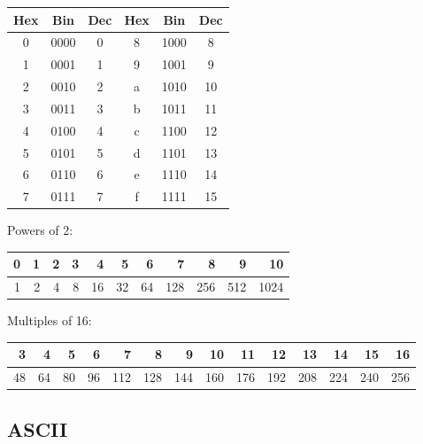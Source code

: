 \documentclass[fontsize=9pt, paper=landscape]{scrartcl}
\begin{document}
\begin{multicols}{2}
\begin{tabular}{|c|c|c|||c|c|c|}
	\hline
	Hex & Bin & Dec & Hex & Bin & Dec \\
	\hline
	0 & 0000 & 0 & 8 & 1000 & 8 \\
	1 & 0001 & 1 & 9 & 1001 & 9 \\
	2 & 0010 & 2 & a & 1010 & 10 \\
	3 & 0011 & 3 & b & 1011 & 11 \\
	\hline
	4 & 0100 & 4 & c & 1100 & 12 \\
	5 & 0101 & 5 & d & 1101 & 13 \\
	6 & 0110 & 6 & e & 1110 & 14 \\
	7 & 0111 & 7 & f & 1111 & 15 \\
	\hline
\end{tabular}

Powers of 2:\\
\begin{tabular}{r|r|r|r|r|r|r|r|r|r|r}
	0 & 1 & 2 & 3 & 4 & 5 & 6 & 7 & 8 & 9 & 10 \\
	\hline
	1 & 2 & 4 & 8 & 16 & 32 & 64 & 128 & 256 & 512 & 1024 \\
\end{tabular}

Multiples of 16:\\
\begin{tabular}{r|r|r|r|r|r|r|r|r|r|r|r|r|r}
	3 & 4 & 5 & 6 & 7 & 8 & 9 & 10 & 11 & 12 & 13 & 14 & 15 & 16 \\
	\hline
	48 & 64 & 80 & 96 & 112 & 128 & 144 & 160 & 176 & 192 & 208 & 224 & 240 & 256 \\
\end{tabular}

\subsection{ASCII}


\end{multicols}
\end{document}
